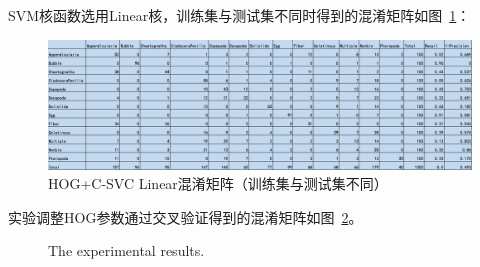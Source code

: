 \documentclass[12pt]{article}
\begin{document}
\begin{enumerate}
SVM核函数选用Linear核，训练集与测试集不同时得到的混淆矩阵如图~\ref{fig: Test-CM-HOG-SVM-linear}：
\begin{figure}[!ht]
\centering
\includegraphics[width=1.0\linewidth]{Test-CM-HOG-SVM-linear}
\caption{HOG+C-SVC Linear混淆矩阵（训练集与测试集不同）}
\label{fig: Test-CM-HOG-SVM-linear}
\end{figure}

实验调整HOG参数通过交叉验证得到的混淆矩阵如图~\ref{fig:HOG-CV-CM}。

\begin{figure}[!ht]
\centering
{}
\caption{The experimental results.}
\label{fig:HOG-CV-CM}
\end{figure}


\end{enumerate}
\end{document}
